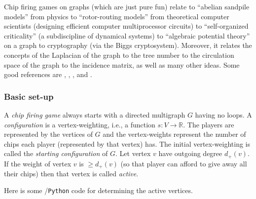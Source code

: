 Chip firing games on graphs (which are just
pure fun) relate to ``abelian sandpile models'' from physics to 
``rotor-routing models'' from theoretical computer scientists
(designing efficient computer multiprocessor circuits) to ``self-organized
criticality'' (a subdiscipline of dynamical systems) to 
``algebraic potential theory'' on a graph \cite{Biggs1997} to cryptography
(via the Biggs cryptosystem). Moreover, it relates the concepts of the 
Laplacian of the graph to the tree number to the circulation space
of the graph to the incidence matrix, as well as many other
ideas. Some good references are \cite{Durgin2009}, \cite{PerkinsonEtAl2009},
\cite{Perlman2009}, \cite{HolroydEtAl2008} and \cite{Biggs1999}.

\subsubsection{Basic set-up}

A {\it chip firing game} always starts with a directed
multigraph $G$ having no loops. A {\it configuration} is a 
vertex-weighting, i.e., a function
$s:V\to {\mathbb{R}}$. The players are represented by the
vertices of $G$ and the vertex-weights represent the number of
chips each player (represented by that vertex) has.
The initial vertex-weighting is called the {\it starting configuration} of $G$.
Let vertex $v$ have outgoing degree $d_+(v)$. If the weight of 
vertex $v$ is $\geq d_+(v)$ (so that player can afford to give away
all their chips) then that vertex is called {\it active}.

Here is some \sage/{\tt Python} code for determining the active vertices.

